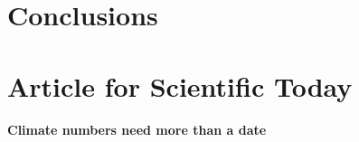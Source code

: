                                                                                                                                                                                                                                                                                                                                                                                                                                    
\section{Conclusions}\label{sec:conclusion}
                                                                                                                                                                                                                                                                                                                                                                                                                                      
                                                                                                                                                                                                                                                                                                                                                                                                                            
                                                                                                                                                                                                                                                                                                                                                                                                                                                                                                    
                                                                                                                                                                                                                                                                                                                                                                                                                                                                                                                                         
\clearpage
\section{Article for Scientific Today}\label{sec:article}
\begin{center}{\large\bfseries Climate numbers need more than a date}\end{center}
                                                                                                                                                                                                              
